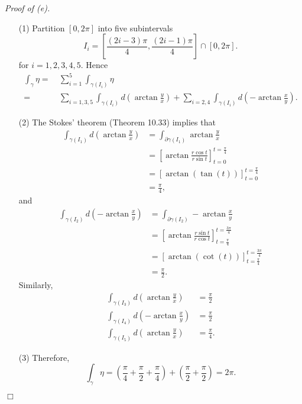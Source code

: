 \documentclass{article}
\begin{document}
\emph{Proof of (e).}
\begin{enumerate}
\item[(1)]
  Partition $[0,2\pi]$ into five subintervals
  \[
    I_i
    = \left[ \frac{(2i-3)\pi}{4}, \frac{(2i-1)\pi}{4} \right]
      \cap [0,2\pi].
  \]
  for $i = 1,2,3,4,5$.
  Hence
  \begin{align*}
    \int_{\gamma} \eta
    =& \: \sum_{i=1}^{5} \int_{\gamma(I_i)} \eta \\
    =& \: \sum_{i=1,3,5} \int_{\gamma(I_i)} d\left( \arctan\frac{y}{x} \right)
      + \sum_{i=2,4} \int_{\gamma(I_i)} d\left( -\arctan\frac{x}{y} \right).
  \end{align*}

\item[(2)]
  The Stokes' theorem (Theorem 10.33) implies that
  \begin{align*}
    \int_{\gamma(I_1)} d\left( \arctan\frac{y}{x} \right)
    &= \int_{\partial\gamma(I_1)} \arctan\frac{y}{x} \\
    &= \left[ \arctan\frac{r\cos t}{r\sin t} \right]_{t = 0}^{t = \frac{\pi}{4}} \\
    &= \left[ \arctan(\tan(t)) \right]_{t = 0}^{t = \frac{\pi}{4}} \\
    &= \frac{\pi}{4},
  \end{align*}
  and
  \begin{align*}
    \int_{\gamma(I_2)} d\left( -\arctan\frac{x}{y} \right)
    &= \int_{\partial\gamma(I_2)} -\arctan\frac{x}{y} \\
    &= \left[ \arctan\frac{r\sin t}{r\cos t} \right]_{t = \frac{\pi}{4}}^{t = \frac{3\pi}{4}} \\
    &= \left[ \arctan(\cot(t)) \right]_{t = \frac{\pi}{4}}^{t = \frac{3\pi}{4}} \\
    &= \frac{\pi}{2}.
  \end{align*}
  Similarly,
  \begin{align*}
    \int_{\gamma(I_3)} d\left( \arctan\frac{y}{x} \right)
    &= \frac{\pi}{2} \\
    \int_{\gamma(I_4)} d\left( -\arctan\frac{x}{y} \right)
    &= \frac{\pi}{2} \\
    \int_{\gamma(I_5)} d\left( \arctan\frac{y}{x} \right)
    &= \frac{\pi}{4}.
  \end{align*}

\item[(3)]
  Therefore,
  \[
    \int_{\gamma} \eta
    = \left( \frac{\pi}{4} + \frac{\pi}{2} + \frac{\pi}{4} \right)
      + \left( \frac{\pi}{2} + \frac{\pi}{2} \right)
    = 2\pi.
  \]
\end{enumerate}
$\Box$ \\
\end{document}

